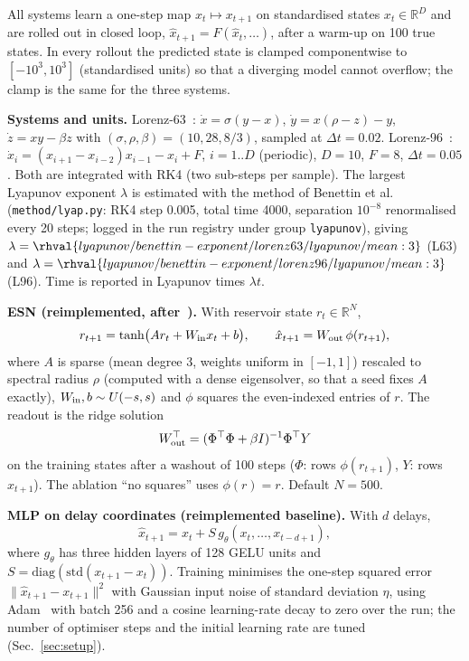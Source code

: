 All systems learn a one-step map $x_t\mapsto x_{t+1}$ on standardised states $x_t\in\mathbb{R}^D$ and are rolled out in closed loop, $\hat x_{t+1}=F(\hat x_t,\dots)$, after a warm-up on 100 true states. In every rollout the predicted state is clamped componentwise to $[-10^3,10^3]$ (standardised units) so that a diverging model cannot overflow; the clamp is the same for the three systems.

\textbf{Systems and units.} Lorenz-63~\cite{lorenz1963deterministic}: $\dot x=\sigma(y-x)$, $\dot y=x(\rho-z)-y$, $\dot z=xy-\beta z$ with $(\sigma,\rho,\beta)=(10,28,8/3)$, sampled at $\Delta t=0.02$. Lorenz-96~\cite{lorenz1998optimal}: $\dot x_i=(x_{i+1}-x_{i-2})x_{i-1}-x_i+F$, $i=1..D$ (periodic), $D=10$, $F=8$, $\Delta t=0.05$. Both are integrated with RK4 (two sub-steps per sample). The largest Lyapunov exponent $\lambda$ is estimated with the method of Benettin et al.~\cite{benettin1980lyapunov} (\texttt{method/lyap.py}: RK4 step 0.005, total time 4000, separation $10^{-8}$ renormalised every 20 steps; logged in the run registry under group \texttt{lyapunov}), giving $\lambda=\rhval{lyapunov/benettin-exponent/lorenz63/lyapunov/mean:3}$ (L63) and $\lambda=\rhval{lyapunov/benettin-exponent/lorenz96/lyapunov/mean:3}$ (L96). Time is reported in Lyapunov times $\lambda t$.

\textbf{ESN (reimplemented, after~\cite{jaeger2004harnessing,pathak2017using}).} With reservoir state $r_t\in\mathbb{R}^N$,
\begin{equation}
r_{t+1}=\tanh\!\big(A r_t+W_{\rm in}x_t+b\big),\qquad \hat x_{t+1}=W_{\rm out}\,\phi(r_{t+1}),
\end{equation}
where $A$ is sparse (mean degree 3, weights uniform in $[-1,1]$) rescaled to spectral radius $\rho$ (computed with a dense eigensolver, so that a seed fixes $A$ exactly), $W_{\rm in},b\sim U(-s,s)$ and $\phi$ squares the even-indexed entries of $r$. The readout is the ridge solution
\begin{equation}
W_{\rm out}^\top=(\Phi^\top\Phi+\beta I)^{-1}\Phi^\top Y
\end{equation}
on the training states after a washout of 100 steps ($\Phi$: rows $\phi(r_{t+1})$, $Y$: rows $x_{t+1}$). The ablation ``no squares'' uses $\phi(r)=r$. Default $N=500$.

\textbf{MLP on delay coordinates (reimplemented baseline).} With $d$ delays,
\begin{equation}
\hat x_{t+1}=x_t+S\,g_\theta(x_t,\dots,x_{t-d+1}),
\end{equation}
where $g_\theta$ has three hidden layers of 128 GELU units and $S=\mathrm{diag}(\mathrm{std}(x_{t+1}-x_t))$. Training minimises the one-step squared error $\|\hat x_{t+1}-x_{t+1}\|^2$ with Gaussian input noise of standard deviation $\eta$, using Adam~\cite{kingma2014adam} with batch 256 and a cosine learning-rate decay to zero over the run; the number of optimiser steps and the initial learning rate are tuned (Sec.~\ref{sec:setup}).

